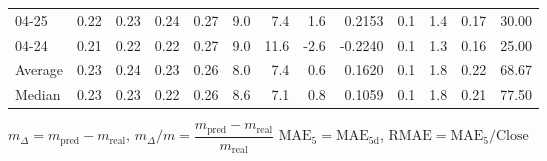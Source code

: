 \begin{threeparttable}
{\begin{tabular}{lrrrrrrrrrrrr}
  04-25 &          0.22 &          0.23 &          0.24 &        0.27 &                 9.0 &                 7.4 &        1.6 &       0.2153 &                 0.1 &              1.4 &            0.17 &                  30.00 \\
  04-24 &          0.21 &          0.22 &          0.22 &        0.27 &                 9.0 &                11.6 &       -2.6 &      -0.2240 &                 0.1 &              1.3 &            0.16 &                  25.00 \\
Average &          0.23 &          0.24 &          0.23 &        0.26 &                 8.0 &                 7.4 &        0.6 &       0.1620 &                 0.1 &              1.8 &            0.22 &                  68.67 \\
 Median &          0.23 &          0.23 &          0.22 &        0.26 &                 8.6 &                 7.1 &        0.8 &       0.1059 &                 0.1 &              1.8 &            0.21 &                  77.50 \\
\bottomrule
\end{tabular}
}
\begin{tablenotes}\footnotesize
\item $m_\Delta=m_{\text{pred}}-m_{\text{real}}$,
$m_\Delta/m=\dfrac{m_{\text{pred}}-m_{\text{real}}}{m_{\text{real}}}$
$\mathrm{MAE}_5=\mathrm{MAE}_{5\text{d}}$,
$\mathrm{RMAE}=\mathrm{MAE}_5/\text{Close}$
\end{tablenotes}
\end{threeparttable}
\endgroup

